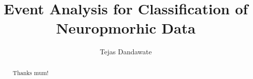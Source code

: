 \documentclass[a4paper, twoside]{report}
\title{Event Analysis for Classification of Neuropmorhic Data}
\author{Tejas Dandawate}
\begin{document}





\renewcommand{\abstractname}{Acknowledgements}
\begin{abstract}
    Thanks mum!
\end{abstract}


\tableofcontents
\listoffigures
\listoftables \thispagestyle{empty}




% 
% 
% 





\appendix





\end{document}
